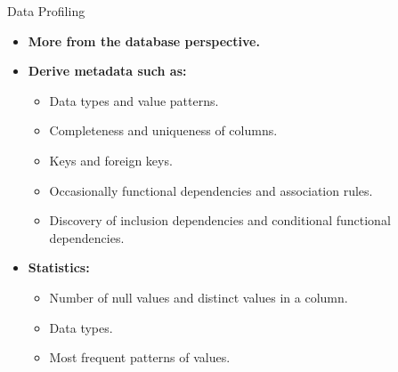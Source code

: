 \begin{frame}{Data Profiling}
  \begin{itemize}
  \item \textbf{More from the database perspective.}
  \item \textbf{Derive metadata such as:}
    \begin{itemize}
    \item Data types and value patterns.
    \item Completeness and uniqueness of columns.
    \item Keys and foreign keys.
    \item Occasionally functional dependencies and association rules.
    \item Discovery of inclusion dependencies and conditional functional dependencies.
    \end{itemize}
  \item \textbf{Statistics:}
    \begin{itemize}
    \item Number of null values and distinct values in a column.
    \item Data types.
    \item Most frequent patterns of values.
    \end{itemize}
  \end{itemize}
\end{frame}
